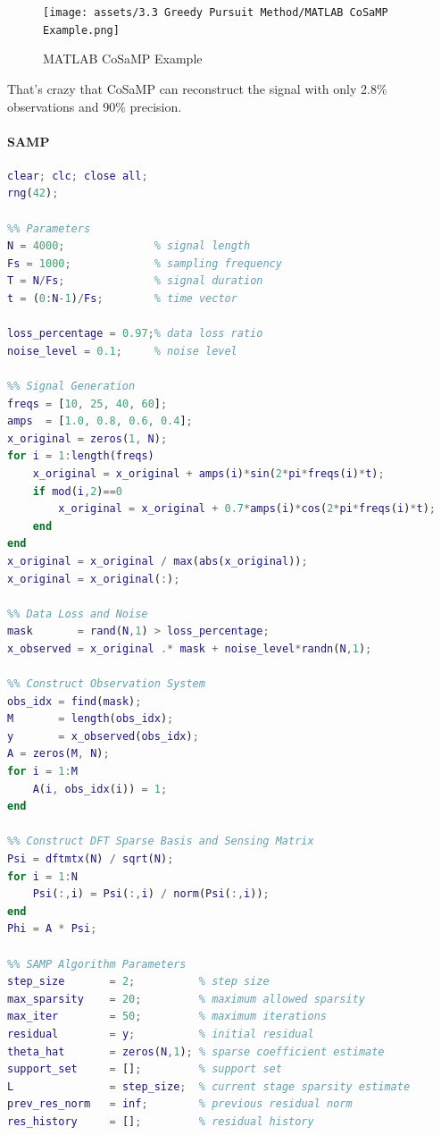 \documentclass[12pt]{ctexart}
\begin{document}
\begin{figure}[H]
  \centering
  \texttt{[image: assets/3.3 Greedy Pursuit Method/MATLAB CoSaMP
  Example.png]}
  \caption{MATLAB CoSaMP Example}
\end{figure}

That's crazy that CoSaMP can reconstruct the signal with only 2.8\% observations and
90\% precision. 

\paragraph{\textbf{SAMP}}
\begin{lstlisting}[language=Matlab]
%% SAMP_example
clear; clc; close all;
rng(42);

%% Parameters
N = 4000;              % signal length
Fs = 1000;             % sampling frequency
T = N/Fs;              % signal duration
t = (0:N-1)/Fs;        % time vector

loss_percentage = 0.97;% data loss ratio
noise_level = 0.1;     % noise level

%% Signal Generation
freqs = [10, 25, 40, 60];
amps  = [1.0, 0.8, 0.6, 0.4];
x_original = zeros(1, N);
for i = 1:length(freqs)
    x_original = x_original + amps(i)*sin(2*pi*freqs(i)*t);
    if mod(i,2)==0
        x_original = x_original + 0.7*amps(i)*cos(2*pi*freqs(i)*t);
    end
end
x_original = x_original / max(abs(x_original));
x_original = x_original(:);

%% Data Loss and Noise
mask       = rand(N,1) > loss_percentage;
x_observed = x_original .* mask + noise_level*randn(N,1);

%% Construct Observation System
obs_idx = find(mask);
M       = length(obs_idx);
y       = x_observed(obs_idx);
A = zeros(M, N);
for i = 1:M
    A(i, obs_idx(i)) = 1;
end

%% Construct DFT Sparse Basis and Sensing Matrix
Psi = dftmtx(N) / sqrt(N);
for i = 1:N
    Psi(:,i) = Psi(:,i) / norm(Psi(:,i));
end
Phi = A * Psi;

%% SAMP Algorithm Parameters
step_size       = 2;          % step size
max_sparsity    = 20;         % maximum allowed sparsity
max_iter        = 50;         % maximum iterations
residual        = y;          % initial residual
theta_hat       = zeros(N,1); % sparse coefficient estimate
support_set     = [];         % support set
L               = step_size;  % current stage sparsity estimate
prev_res_norm   = inf;        % previous residual norm
res_history     = [];         % residual history


\end{lstlisting}
\end{document}
